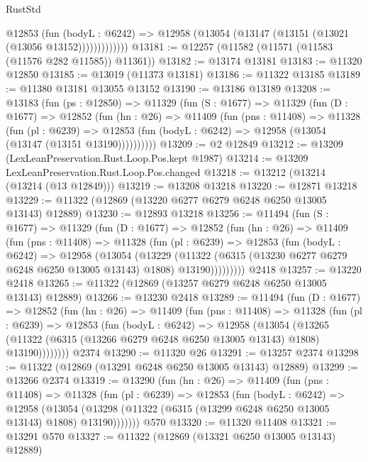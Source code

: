 \begin{lexlean}{RustStd}
\begin{coremodule}
                @12853
                  (fun (bodyL : @6242) =>
                  @12958 (@13054 (@13147 (@13151 (@13021 (@13056 @13152)))))))))))))
@13181 := @12257 (@11582 (@11571 (@11583 (@11576 @282 @11585)) @11361))
@13182 := @13174 @13181
@13183 := @11320 @12850
@13185 := @13019 (@11373 @13181)
@13186 := @11322 @13185
@13189 := @11380 @13181 @13055 @13152
@13190 := @13186 @13189
@13208 := @13183
    (fun (ps : @12850) =>
    @11329
      (fun (S : @1677) =>
      @11329
        (fun (D : @1677) =>
        @12852
          (fun (hn : @26) =>
          @11409
            (fun (pns : @11408) =>
            @11328
              (fun (pl : @6239) =>
              @12853 (fun (bodyL : @6242) => @12958 (@13054 (@13147 (@13151 @13190))))))))))
@13209 := @2 @12849
@13212 := @13209 (LexLeanPreservation.Rust.Loop.Pos.kept @1987)
@13214 := @13209 LexLeanPreservation.Rust.Loop.Pos.changed
@13218 := @13212 (@13214 (@13214 (@13 @12849)))
@13219 := @13208 @13218
@13220 := @12871 @13218
@13229 := @11322 (@12869 (@13220 @6277 @6279 @6248 @6250 @13005 @13143) @12889)
@13230 := @12893 @13218
@13256 := @11494
    (fun (S : @1677) =>
    @11329
      (fun (D : @1677) =>
      @12852
        (fun (hn : @26) =>
        @11409
          (fun (pns : @11408) =>
          @11328
            (fun (pl : @6239) =>
            @12853
              (fun (bodyL : @6242) =>
              @12958
                (@13054
                  (@13229
                    (@11322
                      (@6315 (@13230 @6277 @6279 @6248 @6250 @13005 @13143) @1808)
                      @13190)))))))))
    @2418
@13257 := @13220 @2418
@13265 := @11322 (@12869 (@13257 @6279 @6248 @6250 @13005 @13143) @12889)
@13266 := @13230 @2418
@13289 := @11494
    (fun (D : @1677) =>
    @12852
      (fun (hn : @26) =>
      @11409
        (fun (pns : @11408) =>
        @11328
          (fun (pl : @6239) =>
          @12853
            (fun (bodyL : @6242) =>
            @12958
              (@13054
                (@13265
                  (@11322 (@6315 (@13266 @6279 @6248 @6250 @13005 @13143) @1808) @13190))))))))
    @2374
@13290 := @11320 @26
@13291 := @13257 @2374
@13298 := @11322 (@12869 (@13291 @6248 @6250 @13005 @13143) @12889)
@13299 := @13266 @2374
@13319 := @13290
    (fun (hn : @26) =>
    @11409
      (fun (pns : @11408) =>
      @11328
        (fun (pl : @6239) =>
        @12853
          (fun (bodyL : @6242) =>
          @12958
            (@13054 (@13298 (@11322 (@6315 (@13299 @6248 @6250 @13005 @13143) @1808) @13190)))))))
    @570
@13320 := @11320 @11408
@13321 := @13291 @570
@13327 := @11322 (@12869 (@13321 @6250 @13005 @13143) @12889)

\end{coremodule}
\end{lexlean}

